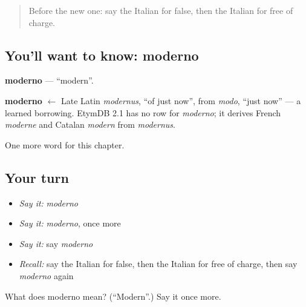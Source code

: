 \begin{quote}
Before the new one: say the Italian for false, then the Italian for free of charge.
\end{quote}

\subsection*{You'll want to know: moderno}
\textbf{moderno} — \textquotedblleft{}modern\textquotedblright{}.

\begin{cousinweb}
\textbf{moderno} $\leftarrow$ Late Latin \emph{modernus}, \textquotedblleft{}of just now\textquotedblright{}, from \emph{modo}, \textquotedblleft{}just now\textquotedblright{} — a learned borrowing. EtymDB 2.1 has no row for \emph{moderno}; it derives French \emph{moderne} and Catalan \emph{modern} from \emph{modernus}.
\end{cousinweb}

\begin{grammarlens}[title={What you've built}]
One more word for this chapter.
\end{grammarlens}

\subsection*{Your turn}
\begin{itemize}
\raggedright
  \item \emph{Say it:} \emph{moderno}
  \item \emph{Say it:} \emph{moderno}, once more
  \item \emph{Say it:} say \emph{moderno}
  \item \emph{Recall:} say the Italian for false, then the Italian for free of charge, then say \emph{moderno} again
\end{itemize}

\begin{tcolorbox}[breakable,colback=teal!4,colframe=teal!35!black,title={Before you move on}]
What does moderno mean? (\textquotedblleft{}Modern\textquotedblright{}.) Say it once more.
\end{tcolorbox}
